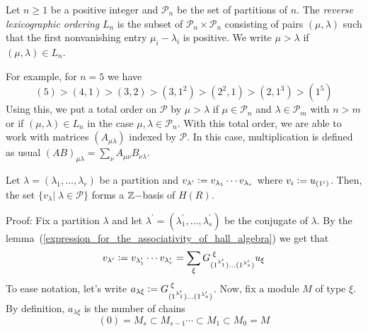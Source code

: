 \begin{dang}
    \begin{definition}
        Let $n\geq1$ be a positive integer and $\mathcal{P}_n$ be the set of partitions of $n$. The \textit{reverse lexicographic ordering} $L_n$ is the subset of $\mathcal{P}_n\times\mathcal{P}_n$ consisting of pairs $(\mu,\lambda)$ such that the first nonvanishing entry $\mu_i-\lambda_i$ is positive. We write $\mu>\lambda$ if $(\mu,\lambda)\in L_n$.
    \end{definition}
\end{dang}
For example, for $n=5$ we have
\begin{equation}
    (5)>(4,1)>(3,2)>(3,1^2)>(2^2,1)>(2,1^3)>(1^5)
\end{equation}
Using this, we put a total order on $\mathcal{P}$ by $\mu>\lambda$ if $\mu\in\mathcal{P}_n$ and $\lambda\in\mathcal{P}_m$ with $n>m$ or if $(\mu,\lambda)\in L_n$ in the case $\mu,\lambda\in\mathcal{P}_n$. With this total order, we are able to work with matrices $(A_{\mu\lambda})$ indexed by $\mathcal{P}$. In this case, multiplication is defined as usual $(AB)_{\mu\lambda}=\sum_\nu A_{\mu\nu}B_{\nu\lambda}$.
\begin{dang}
    \begin{theorem}\label{free generators of the hall algebra}\cite{macdonald1998symmetric}
        Let $\lambda=(\lambda_1,\dots,\lambda_r)$ be a partition and $v_{\lambda^\prime}\bydef v_{\lambda_1}\cdots v_{\lambda_r}$ where $v_i\bydef u_{(1^i)}$. Then, the set $\{v_{\lambda}|\;\lambda\in\mathcal{P}\}$ forms a $\mathbb{Z}-$basis of $H(R)$.
    \end{theorem}
\end{dang}
Proof: Fix a partition $\lambda$ and let $\lambda^\prime = (\lambda_1^\prime,\dots,\lambda_s^\prime)$ be the conjugate of $\lambda$. By the lemma~(\ref{expression_for_the_associativity_of_hall_algebra}) we get that 
\begin{equation}\label{vlambda_to_ulambda}
    v_{\lambda^\prime}\bydef v_{\lambda_1^\prime}\cdots v_{\lambda_r^\prime}=\sum_{\xi}G_{(1^{\lambda_1^\prime})\dots(1^{\lambda_s^\prime})}^{\;\xi}u_{\xi}
\end{equation}
To ease notation, let's write $a_{\lambda\xi}\bydef G_{(1^{\lambda_1^\prime})\dots(1^{\lambda_s^\prime})}^{\;\xi}$. Now, fix a module $M$ of type $\xi$. By definition, $a_{\lambda\xi}$ is the number of chains
\begin{equation}
    (0)=M_s\subset M_{s-1}\cdots\subset M_1\subset M_0=M
\end{equation}
